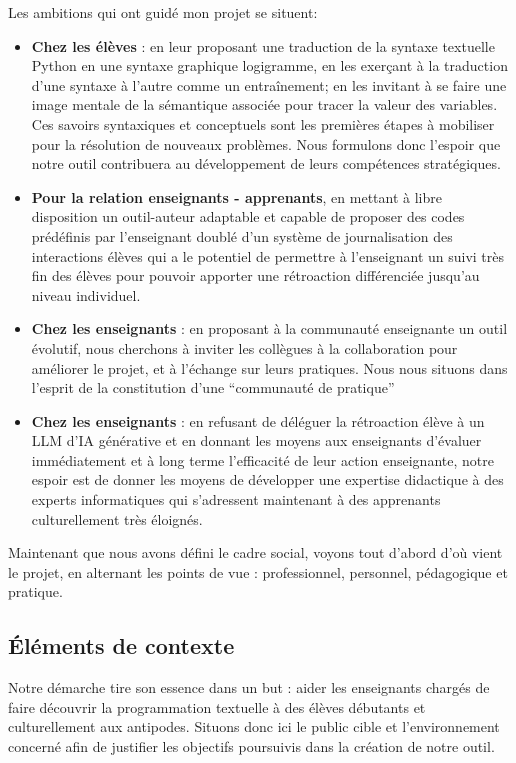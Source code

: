 \documentclass[11pt,a4paper]{article}
\let\cite\parencite
\begin{document}
\par Les ambitions qui ont guidé mon projet se situent:
\begin{itemize}
    \item \textbf{Chez les élèves} : en leur proposant une traduction de la syntaxe textuelle Python en une syntaxe graphique logigramme, en les exerçant à la traduction d'une syntaxe à l'autre comme un entraînement; en les invitant à se faire une image mentale de la sémantique associée pour tracer la valeur des variables. Ces savoirs syntaxiques et conceptuels sont les premières étapes à mobiliser pour la résolution de nouveaux problèmes. Nous formulons donc l'espoir que notre outil contribuera au développement de leurs compétences stratégiques.
    \item \textbf{Pour la relation enseignants - apprenants}, en mettant à libre disposition un outil-auteur adaptable et capable de proposer des codes prédéfinis par l'enseignant doublé d'un système de journalisation des interactions élèves qui a le potentiel de permettre à l'enseignant un suivi très fin des élèves pour pouvoir apporter une rétroaction différenciée jusqu'au niveau individuel.
    \item \textbf{Chez les enseignants} : en proposant à la communauté enseignante un outil évolutif, nous cherchons à inviter les collègues à la collaboration pour améliorer le projet, et à l'échange sur leurs pratiques. Nous nous situons dans l'esprit de la constitution d'une ``communauté de pratique'' \cite{wenger} \item \textbf{Chez les enseignants} : en refusant de déléguer la rétroaction élève à un LLM d'IA générative et en donnant les moyens aux enseignants d'évaluer immédiatement et à long terme l'efficacité de leur action enseignante, notre espoir est de donner les moyens de développer une expertise didactique à des experts informatiques qui s'adressent maintenant à des apprenants culturellement très éloignés.
\end{itemize}
Maintenant que nous avons défini le cadre social, voyons tout d'abord d'où vient le projet, en alternant les points de vue : professionnel, personnel, pédagogique et pratique.

\subsection{Éléments de contexte}
Notre démarche tire son essence dans un but : aider les enseignants chargés de faire découvrir la programmation textuelle à des élèves débutants et culturellement aux antipodes. Situons donc ici le public cible et l'environnement concerné afin de justifier les objectifs poursuivis dans la création de notre outil. 
\end{document}
